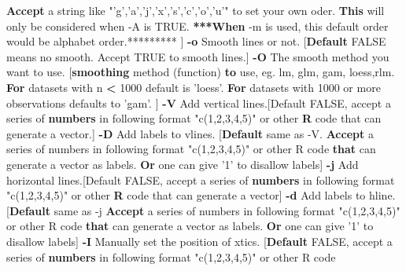 \documentclass[]{article}
\newenvironment{Shaded}{\begin{snugshade}}{\end{snugshade}}
\newcommand{\KeywordTok}[1]{\textcolor[rgb]{0.13,0.29,0.53}{\textbf{{#1}}}}
\newcommand{\StringTok}[1]{\textcolor[rgb]{0.31,0.60,0.02}{{#1}}}
\newcommand{\NormalTok}[1]{{#1}}
\numberwithin{figure}{section}
\numberwithin{table}{section}
\theoremstyle{definition}
\theoremstyle{definition}
\theoremstyle{definition}
\theoremstyle{remark}
\begin{document}
\begin{Shaded}
\begin{Highlighting}[]
        \KeywordTok{Accept} \NormalTok{a string like }\StringTok{"'g','a','j','x','s','c','o','u'"} \NormalTok{to set your own oder.}
        \KeywordTok{This} \NormalTok{will only be considered when -A is TRUE.}
        \KeywordTok{***When} \NormalTok{-m is used, this default order would be alphabet order.********* }
        \NormalTok{]}
    \KeywordTok{-o}  \NormalTok{Smooth lines or not.}
        \NormalTok{[}\KeywordTok{Default} \NormalTok{FALSE means no smooth. Accept TRUE to smooth lines.]}
    \KeywordTok{-O}  \NormalTok{The smooth method you want to use.}
        \NormalTok{[}\KeywordTok{smoothing} \NormalTok{method (function) }\KeywordTok{to} \NormalTok{use,  eg. lm, glm, gam, loess,rlm.}
        \KeywordTok{For} \NormalTok{datasets with n }\KeywordTok{<} \NormalTok{1000 default is }\StringTok{'loess'}\NormalTok{. }
        \KeywordTok{For} \NormalTok{datasets with 1000 or more observations defaults to }\StringTok{'gam'}\NormalTok{.}
        \NormalTok{]}
    \KeywordTok{-V}  \NormalTok{Add vertical lines.[Default FALSE, accept a series of}
        \KeywordTok{numbers} \NormalTok{in following format }\StringTok{"c(1,2,3,4,5)"} \NormalTok{or other}
        \KeywordTok{R} \NormalTok{code that can generate a vector.]}
    \KeywordTok{-D}  \NormalTok{Add labels to vlines.}
        \NormalTok{[}\KeywordTok{Default} \NormalTok{same as -V.}
        \KeywordTok{Accept} \NormalTok{a series of numbers in following format }\StringTok{"c(1,2,3,4,5)"} \NormalTok{or other R code}
        \KeywordTok{that} \NormalTok{can generate a vector as labels.}
        \KeywordTok{Or} \NormalTok{one can give }\StringTok{'1'} \NormalTok{to disallow labels]}
    \KeywordTok{-j}  \NormalTok{Add horizontal lines.[Default FALSE, accept a series of}
        \KeywordTok{numbers} \NormalTok{in following format }\StringTok{"c(1,2,3,4,5)"} \NormalTok{or other}
        \KeywordTok{R} \NormalTok{code that can generate a vector]}
    \KeywordTok{-d}  \NormalTok{Add labels to hline.}
        \NormalTok{[}\KeywordTok{Default} \NormalTok{same as -j}
        \KeywordTok{Accept} \NormalTok{a series of numbers in following format }\StringTok{"c(1,2,3,4,5)"} \NormalTok{or other R code}
        \KeywordTok{that} \NormalTok{can generate a vector as labels.}
        \KeywordTok{Or} \NormalTok{one can give }\StringTok{'1'} \NormalTok{to disallow labels]}
    \KeywordTok{-I}  \NormalTok{Manually set the position of xtics.}
        \NormalTok{[}\KeywordTok{Default} \NormalTok{FALSE,  accept a series of}
        \KeywordTok{numbers} \NormalTok{in following format }\StringTok{"c(1,2,3,4,5)"} \NormalTok{or other R code}

\end{Highlighting}
\end{Shaded}
\end{document}
